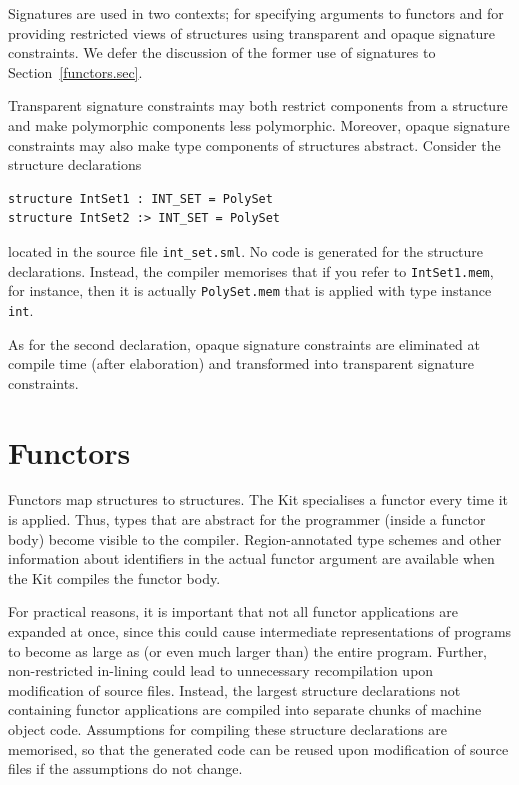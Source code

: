 \documentclass[12pt]{book}
\begin{document}
Signatures are used in two contexts; for specifying arguments to
functors and for providing restricted views of structures using
%
transparent and 
%
opaque signature constraints. We defer the discussion
of the former use of signatures to Section~\ref{functors.sec}.

Transparent signature constraints may both restrict components from a
structure and make polymorphic components less polymorphic. Moreover,
opaque signature constraints may also make type components of
structures abstract. Consider the structure 
declarations
\begin{verbatim}
structure IntSet1 : INT_SET = PolySet
structure IntSet2 :> INT_SET = PolySet
\end{verbatim}

\noindent
located in the source file {\tt int\_set.sml}. No code is generated
for the structure declarations. Instead, the compiler memorises that
if you refer to {\tt IntSet1.mem}, for instance, then it is actually
{\tt PolySet.mem} that is applied with type instance {\tt int}.

As for the second declaration, opaque signature constraints are
eliminated at compile time (after elaboration) and transformed into
transparent signature constraints.

\section{Functors \label{functors.sec}}
Functors map structures to structures. The Kit
specialises a functor every time it is applied.
Thus, types that are
abstract for the programmer (inside a functor body) become 
visible to the compiler.
Region-annotated type schemes and other information about identifiers in the
actual functor argument
are available when the Kit compiles the functor body.

For practical reasons, it is important that not all functor applications
are expanded at once, since this could 
cause intermediate representations of
programs  to become as large as (or even 
much larger than) the entire
program. Further, non-restricted in-lining could lead to unnecessary
recompilation upon modification of source files. Instead, the largest
structure declarations not containing functor applications are
compiled into separate chunks of machine object code. Assumptions for
compiling these structure declarations are memorised, so that the
generated code can be reused upon modification of source files if the
assumptions do not change.
\end{document}
